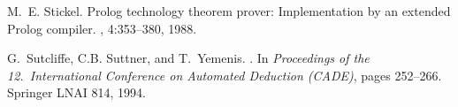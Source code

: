 \begin{thebibliography}{}
M.~E. Stickel.
 {P}rolog technology theorem prover: {I}mplementation by an
  extended {P}rolog compiler.
, 4:353--380, 1988.

G.~Sutcliffe, C.B. Suttner, and T.~Yemenis.
.
\newblock In {\em Proceedings of the 12.\ International Conference on Automated
  Deduction (CADE)}, pages 252--266. Springer LNAI 814, 1994.

\end{thebibliography}


